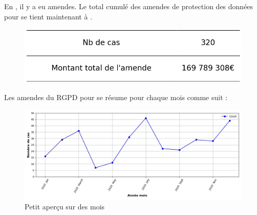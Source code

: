 \documentclass[french]{article}
\begin{document}
\newpage




	\begin{multicols}{2}
	
	En ,  il y a eu \textbf{} amendes.
	Le total cumulé des amendes de protection des données pour  se tient maintenant à \textbf{}.
	
	\begin{figure}[H]
	\centering\includegraphics[width=1\linewidth]{graphs/counter_year}
	\end{figure}


	Les amendes du RGPD pour  se résume pour chaque mois comme suit :

	\begin{figure}
	[H]\centering\includegraphics[width = 1.2\linewidth]{graphs/NbFinesPerMonth_year_graph}
	\caption{Petit aperçu sur des mois }
	\end{figure}

	\end{multicols}
\end{document}

